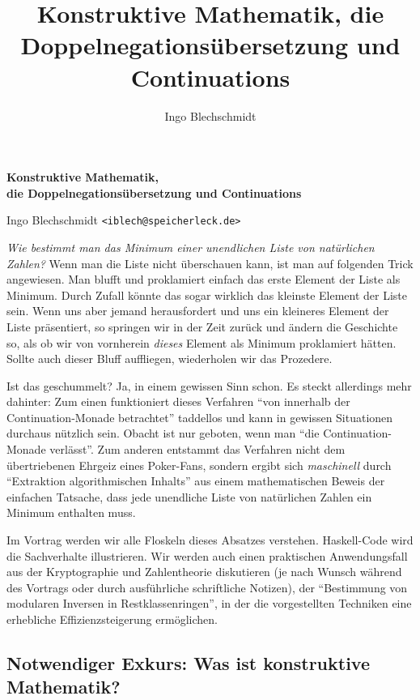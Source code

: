 \documentclass[a4paper,ngerman,10pt]{scrartcl}
\title{Konstruktive Mathematik, die Doppelnegationsübersetzung und Continuations}
\author{Ingo Blechschmidt}
\theoremstyle{plain}
\begin{document}
\begin{center}\large\textsf{\textbf{Konstruktive Mathematik, \\ die
Doppelnegationsübersetzung und Continuations}}

\normalsize Ingo Blechschmidt \texttt{<iblech@speicherleck.de>}\end{center}

\emph{Wie bestimmt man das Minimum einer unendlichen Liste von natürlichen
Zahlen?} Wenn man die Liste nicht überschauen kann, ist man auf folgenden Trick
angewiesen. Man blufft und proklamiert einfach das erste Element der Liste als
Minimum. Durch Zufall könnte das sogar wirklich das kleinste Element der Liste
sein. Wenn uns aber jemand herausfordert und uns ein kleineres Element der
Liste präsentiert, so springen wir in der Zeit zurück und ändern die Geschichte
so, als ob wir von vornherein \emph{dieses} Element als Minimum proklamiert
hätten. Sollte auch dieser Bluff auffliegen, wiederholen wir das Prozedere.

Ist das geschummelt? Ja, in einem gewissen Sinn schon. Es steckt allerdings
mehr dahinter: Zum einen funktioniert dieses Verfahren "`von innerhalb der
Continuation-Monade betrachtet"' taddellos und kann in gewissen Situationen
durchaus nützlich sein. Obacht ist nur geboten, wenn man "`die
Continuation-Monade verlässt"'. Zum anderen entstammt das Verfahren nicht dem
übertriebenen Ehrgeiz eines Poker-Fans, sondern ergibt sich \emph{maschinell}
durch "`Extraktion algorithmischen Inhalts"' aus einem mathematischen Beweis
der einfachen Tatsache, dass jede unendliche Liste von natürlichen Zahlen ein
Minimum enthalten muss.

Im Vortrag werden wir alle Floskeln dieses Absatzes verstehen. Haskell-Code
wird die Sachverhalte illustrieren. Wir werden auch einen praktischen
Anwendungsfall aus der Kryptographie und Zahlentheorie diskutieren (je nach
Wunsch während des Vortrags oder durch ausführliche schriftliche Notizen), der
"`Bestimmung von modularen Inversen in Restklassenringen"', in der die
vorgestellten Techniken eine erhebliche Effizienzsteigerung ermöglichen.


\subsection*{Notwendiger Exkurs: Was ist konstruktive Mathematik?}
\end{document}
